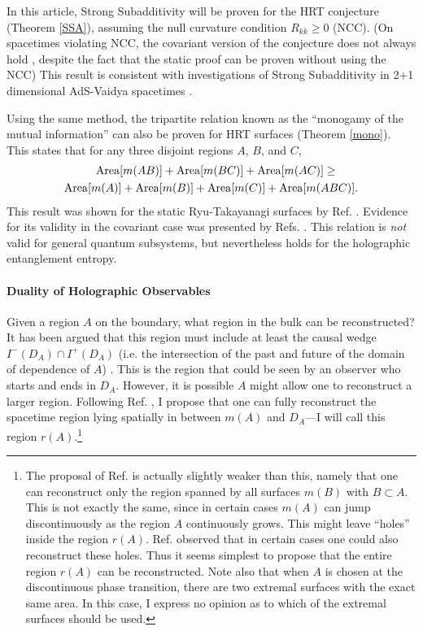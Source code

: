 \documentclass[12pt]{article}
\begin{document}
In this article, Strong Subadditivity will be proven for the HRT conjecture (Theorem \ref{SSA}), assuming the null curvature condition $R_{kk} \ge 0$ (NCC).  (On spacetimes violating NCC, the covariant version of the conjecture does not always hold \cite{AT11,CHH12}, despite the fact that the static proof can be proven without using the NCC)  This result is consistent with investigations of Strong Subadditivity in 2+1 dimensional AdS-Vaidya spacetimes \cite{AT11,CHH12}.

Using the same method, the tripartite relation known as the ``monogamy of the mutual information'' can also be proven for HRT surfaces (Theorem \ref{mono}).  This states that for any three disjoint regions $A$, $B$, and $C$,
\begin{align}
\mathrm{Area}[m(AB)] + \mathrm{Area}[m(BC)] + \mathrm{Area}[m(AC)] \ge \phantom{Mn} \notag \\ 
\mathrm{Area}[m(A)] + \mathrm{Area}[m(B)] + \mathrm{Area}[m(C)]  + \mathrm{Area}[m(ABC)].
\end{align}
This result was shown for the static Ryu-Takayanagi surfaces by Ref. \cite{HHM11}.  Evidence for its validity in the covariant case was presented by Refs. \cite{AT11,BBCCG11}.  This relation is \emph{not} valid for general quantum subsystems, but nevertheless holds for the holographic entanglement entropy.

\paragraph{Duality of Holographic Observables}
Given a region $A$ on the boundary, what region in the bulk can be reconstructed?  It has been argued that this region must include at least the causal wedge $I^-(D_A) \cap I^+(D_A)$ (i.e. the intersection of the past and future of the domain of dependence of $A$) \cite{HR12, CKNR12, BLR12}.  This is the region that could be seen by an observer who starts and ends in $D_A$.  However, it is possible $A$ might allow one to reconstruct a larger region.  Following Ref. \cite{CKNR12}, I propose that one can fully reconstruct the spacetime region lying spatially in between $m(A)$ and $D_A$---I will call this region $r(A)$.\footnote{The proposal of Ref. \cite{CKNR12} is actually slightly weaker than this, namely that one can reconstruct only the region spanned by all surfaces $m(B)$ with $B \subset A$.  This is not exactly the same, since in certain cases $m(A)$ can jump discontinuously as the region $A$ continuously grows.  This might leave ``holes'' inside the region $r(A)$.  Ref. \cite{CKNR12} observed that in certain cases one could also reconstruct these holes.  Thus it seems simplest to propose that the entire region $r(A)$ can be reconstructed.  Note also that when $A$ is chosen at the discontinuous phase transition, there are two extremal surfaces with the exact same area.  In this case, I express no opinion as to which of the extremal surfaces should be used.}
\end{document}

